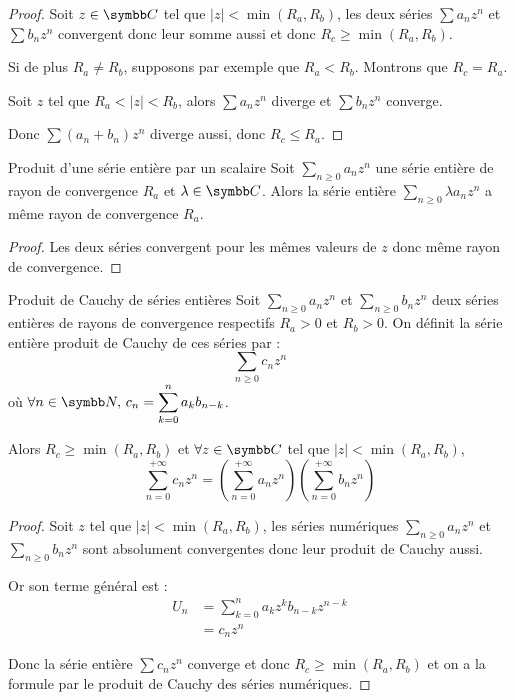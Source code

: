 \begin{proof}
    Soit $z \in \C$ tel que $|z| < \min(R_a, R_b)$, les deux séries $\sum a_n z^n$ et $\sum b_n z^n$ 
    convergent donc leur somme aussi et donc $R_c \geqslant \min(R_a, R_b)$.

    Si de plus $R_a \neq R_b$, supposons par exemple que $R_a < R_b$. Montrons que $R_c = R_a$.

    Soit $z $ tel que $R_a < |z| < R_b$, alors $\sum a_n z^n$ diverge et $\sum b_n z^n$ converge.

    Donc $\sum (a_n + b_n) z^n$ diverge aussi, donc $R_c \leqslant R_a$.
\end{proof}

\begin{proposition}{Produit d'une série entière par un scalaire}{}
    Soit $\sum_{n \geqslant 0} a_n z^n$ une série entière de rayon de convergence $R_a$ et
    $\lambda \in \C$. Alors la série entière $\sum_{n \geqslant 0} \lambda a_n z^n$ a même 
    rayon de convergence $R_a$.
\end{proposition}

\begin{proof}
    Les deux séries convergent pour les mêmes valeurs de $z$ donc même rayon de convergence.
\end{proof}

\begin{theoreme}{Produit de Cauchy de séries entières}{}
    Soit $\sum_{n \geqslant 0} a_n z^n$ et $\sum_{n \geqslant 0} b_n z^n$ deux séries entières 
    de rayons de convergence respectifs $R_a > 0$ et $R_b > 0$. On définit la série entière produit de Cauchy 
    de ces séries par :
    \[\sum_{n \geqslant 0} c_n z^n\] 
    où $\displaystyle \forall n \in \N, \, c_n = \sum_{k = 0}^n a_k b_{n - k}$.

    Alors $R_c \geqslant \min(R_a, R_b)$ et $\forall z \in \C$ tel que $|z| < \min(R_a, R_b)$, 
    \[\sum_{n = 0}^{+\infty} c_n z^n = \left( \sum_{n = 0}^{+\infty} a_n z^n \right) \left( \sum_{n = 0}^{+\infty} b_n z^n \right)\]
\end{theoreme}

\begin{proof}
    Soit $z$ tel que $|z| < \min(R_a, R_b)$, les séries numériques $\sum_{n \geqslant 0} a_n z^n$ 
    et $\sum_{n \geqslant 0} b_n z^n$ sont absolument convergentes donc leur produit de Cauchy 
    aussi. 

    Or son terme général est :
    \begin{align*}
        U_n & = \sum_{k = 0}^n a_k z^k b_{n - k} z^{n - k} \\
        & = c_n z^n
    \end{align*}

    Donc la série entière $\sum c_n z^n$ converge et donc $R_c \geqslant \min(R_a, R_b)$ et 
    on a la formule par le produit de Cauchy des séries numériques.
\end{proof}

